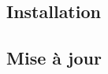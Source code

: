 \documentclass[a4paper,10pt]{article}
\begin{document}
\color{green}
\subsection{Installation}\color{white}

\color{green}
\subsection{Mise à jour}\color{white}
\end{document}
